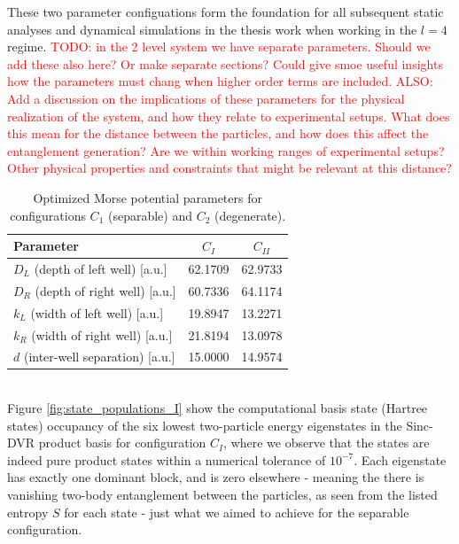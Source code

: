 \documentclass{subfiles}
\begin{document}
These two parameter configuations form the foundation for all subsequent static analyses and dynamical simulations in the thesis work when working in the $l=4$ regime. \textcolor{red}{TODO: in the 2 level system we have separate parameters. Should we add these also here? Or make separate sections? Could give smoe useful insights how the parameters must chang when higher order terms are included. ALSO: Add a discussion on the implications of these parameters for the physical realization of the system, and how they relate to experimental setups. What does this mean for the distance between the particles, and how does this affect the entanglement generation? Are we within working ranges of experimental setups? Other physical properties and constraints that might be relevant at this distance?}
\begin{table}[h!]
  \centering
  \caption{Optimized Morse potential parameters for configurations \(C_1\) (separable) and \(C_2\) (degenerate).}
  \label{tab:optimized_params}
  \begin{tabular}{lcc}
    \toprule
    Parameter & $C_{I}$ & $C_{II}$ \\
    \midrule
    \(D_L\) (depth of left well)       [a.u.] & 62.1709 & 62.9733 \\
    \(D_R\) (depth of right well)      [a.u.] & 60.7336 & 64.1174 \\
    \(k_L\) (width of left well)       [a.u.] & 19.8947 & 13.2271 \\
    \(k_R\) (width of right well)      [a.u.] & 21.8194 & 13.0978 \\
    \(d\)   (inter-well separation)     [a.u.] & 15.0000 & 14.9574 \\
    \bottomrule
  \end{tabular}
\end{table}
\\
Figure \ref{fig:state_populations_I} show the computational basis state (Hartree states) occupancy of the six lowest two-particle energy eigenstates in the Sinc-DVR product basis for configuration $C_I$, where we observe that the states are indeed pure product states within a numerical tolerance of $10^{-7}$. Each eigenstate has exactly one dominant block, and is zero elsewhere - meaning the there is vanishing two-body entanglement between the particles, as seen from the listed entropy $S$ for each state - just what we aimed to achieve for the separable configuration. 
\end{document}
